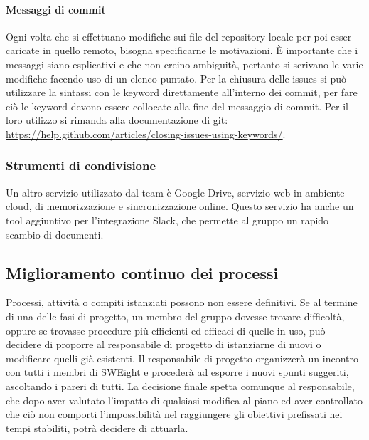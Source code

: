\paragraph{Messaggi di commit}
Ogni volta che si effettuano modifiche sui file del {repository} locale per poi esser caricate in
quello remoto, bisogna specificarne le motivazioni. \uppercase{è} importante che i messaggi siano esplicativi e che non creino ambiguità, pertanto si scrivano le varie modifiche facendo uso di un elenco puntato.
Per la chiusura delle {issues} si può utilizzare la sintassi con le {keyword} direttamente all'interno dei {commit}, per fare ciò le keyword devono essere collocate alla fine del messaggio di commit. Per il loro utilizzo si rimanda alla documentazione di {git}: \url{https://help.github.com/articles/closing-issues-using-keywords/}. 

\subsubsection{Strumenti di condivisione}
Un altro servizio utilizzato dal team è Google Drive, servizio web in {ambiente cloud}, di memorizzazione e sincronizzazione online. Questo servizio ha anche un tool aggiuntivo per l'integrazione {Slack}, che permette al gruppo un rapido scambio di documenti.

\subsection{Miglioramento continuo dei processi}
Processi, attività o compiti istanziati possono non essere definitivi. Se al termine di una delle fasi di progetto, un membro del gruppo dovesse trovare difficoltà, oppure se trovasse procedure più efficienti ed efficaci di quelle in uso, può decidere di proporre al responsabile di progetto di istanziarne di nuovi o modificare quelli già esistenti.  
\newline
Il responsabile di progetto organizzerà un incontro con tutti i membri di SWEight e procederà ad esporre i nuovi spunti suggeriti, ascoltando i pareri di tutti. 
\newline
La decisione finale spetta comunque al responsabile, che dopo aver valutato l'impatto di qualsiasi modifica al piano ed aver controllato che ciò non comporti l'impossibilità nel raggiungere gli obiettivi prefissati nei tempi stabiliti, potrà decidere di attuarla.

